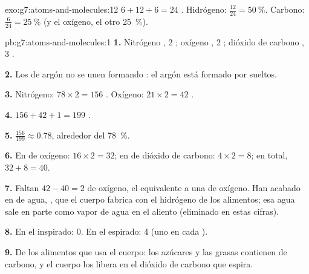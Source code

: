\begin{solution}{exo:g7:atoms-and-molecules:12}
$6 + 12 + 6 = 24$ . Hidrógeno: $\frac{12}{24} = \qty{50}{\percent}$.
Carbono: $\frac{6}{24} = \qty{25}{\percent}$ (y el oxígeno, el otro
\qty{25}{\percent}).
\end{solution}

\begin{solution}{pb:g7:atoms-and-molecules:1}
\textbf{1.} Nitrógeno , 2 ; oxígeno , 2 ;
dióxido de carbono , 3 .

\textbf{2.} Los  de argón no se unen formando : el argón
está formado por  sueltos.

\textbf{3.} Nitrógeno: $78 \times 2 = 156$ . Oxígeno: $21\times 2 =
42$ .

\textbf{4.} $156 + 42 + 1 = 199$ .

\textbf{5.} $\frac{156}{199} \approx 0.78$, alrededor del
\qty{78}{\percent}.

\textbf{6.} En  de oxígeno: $16\times 2 = 32$; en  de
dióxido de carbono: $4 \times 2 = 8$; en total, $32 + 8 = 40$.

\textbf{7.} Faltan $42 - 40 = 2$  de oxígeno, el equivalente a una
 de oxígeno. Han acabado en  de agua, , que el
cuerpo fabrica con el hidrógeno de los alimentos; esa agua sale en parte
como vapor de agua en el aliento (eliminado en estas cifras).

\textbf{8.} En el  inspirado: 0. En el espirado: 4 (uno en cada
).

\textbf{9.} De los alimentos que usa el cuerpo: los azúcares y las
grasas contienen  de carbono, y el cuerpo los libera en el
dióxido de carbono que espira.


\end{solution}
